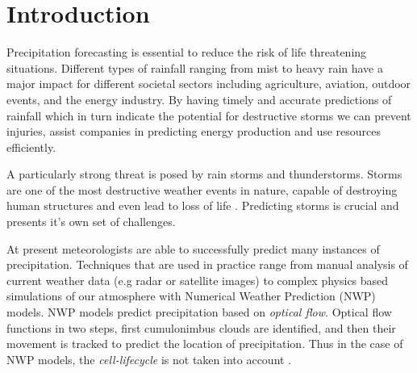 \documentclass[acmtog, authorversion]{acmart}
\begin{document}
\maketitle

\section{Introduction} \label{introduction}

Precipitation forecasting is essential to reduce the risk of life threatening situations. Different types of rainfall ranging from mist to heavy rain have a major impact for different societal sectors including agriculture, aviation, outdoor events, and the energy industry.
By having timely and accurate predictions of rainfall which in turn indicate the potential for destructive storms we can prevent injuries, assist companies in predicting energy production and use resources efficiently.
\medskip


A particularly strong threat is posed by rain storms and thunderstorms. Storms are one of the most destructive weather events in nature, capable of destroying human structures and even lead to loss of life \cite{noaa-national-severe-storms-laboratory-no-date}. Predicting storms is crucial and presents it's own set of challenges.
\medskip

At present meteorologists are able to successfully predict many instances of precipitation. Techniques that are used in practice range from manual analysis of current weather data (e.g radar or satellite images) to complex physics based simulations of our atmosphere with Numerical Weather Prediction (\textsc{NWP}) models.
\textsc{NWP} models predict precipitation based on \textit{optical flow}. Optical flow functions in two steps, first cumulonimbus clouds are identified, and then their movement is tracked to predict the location of precipitation. Thus in the case of \textsc{NWP} models, the \textit{cell-lifecycle} \cite{noaas-national-weather-service-no-date} is not taken into account \cite{prudden2020review}.
\medskip
\end{document}

